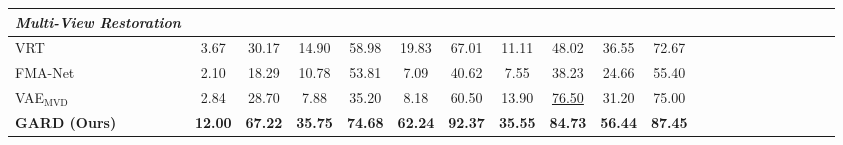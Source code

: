 \begin{table}[t]
{\begin{tabular}{lcccccccccccccccccccc}
\midrule

\textit{Multi-View Restoration} \\
\midrule

VRT~\cite{liang2024vrt}
& 3.67 & 30.17
& 14.90 & 58.98
& 19.83 & 67.01
& 11.11 & 48.02
& 36.55 & 72.67
\\


FMA-Net~\cite{Youk_2024_CVPR}
&  2.10  &    18.29
&  10.78 &    53.81
&  7.09 &    40.62
&  7.55 &    38.23
&  24.66  &   55.40
\\



VAE$_\text{MVD}$
& 2.84 & 28.70  
& 7.88 & 35.20 
& 8.18 & 60.50
& {13.90} & \underline{76.50}
& 31.20 & 75.00 \\

\textbf{GARD (Ours)}
& \textbf{12.00} & \textbf{67.22}
& \textbf{35.75} & \textbf{74.68} 
& \textbf{62.24} & \textbf{92.37}
& \textbf{35.55} & \textbf{84.73}
& \textbf{56.44} & \textbf{87.45} \\

\bottomrule
\end{tabular}
}
\end{table}